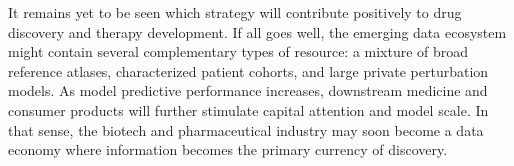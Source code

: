 It remains yet to be seen which strategy will contribute positively to drug discovery and therapy development. If all goes well, the emerging data ecosystem might contain several complementary types of resource: a mixture of broad reference atlases, characterized patient cohorts, and large private perturbation models. As model predictive performance increases, downstream medicine and consumer products will further stimulate capital attention and model scale. In that sense, the biotech and pharmaceutical industry may soon become a data economy where information becomes the primary currency of discovery.